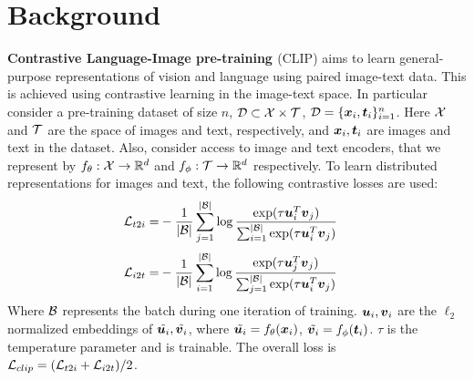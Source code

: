 \documentclass[11pt]{article}
\begin{document}
\section{Background}
\label{sec_background}
\textbf{Contrastive Language-Image pre-training \citep{radford2021learning}} (CLIP) aims to learn general-purpose representations of vision and language using paired image-text data. This is achieved using contrastive learning in the image-text space. In particular consider a pre-training dataset of size $n$, $\mathcal{D} \subset \mathcal{X} \times \mathcal{T}$, $\mathcal{D} = \{\boldsymbol{x}_i, \boldsymbol{t}_i\}_{i=1}^{n}$. Here $\mathcal{X}$ and $\mathcal{T}$ are the space of images and text, respectively, and $\boldsymbol{x}_i, \boldsymbol{t}_i$ are images and text in the dataset. Also, consider access to image and text encoders, that we represent by $f_{\theta}: \mathcal{X} \rightarrow \mathbb{R}^d$ and $f_{\phi}: \mathcal{T} \rightarrow \mathbb{R}^d$ respectively. To learn distributed representations for images and text, the following contrastive losses are used:
{
\begin{align}\label{eq:t2i_clip}
\mathcal{L}_{t2i}	= & - \frac{1}{|\mathcal{B}|} \sum_{j=1}^{|\mathcal{B}|}
\log \frac{ \exp(\tau \boldsymbol{u}_i^T \boldsymbol{v}_j )  }{\sum_{i=1}^{|\mathcal{B}|}  \exp(\tau \boldsymbol{u}_{i}^T \boldsymbol{v}_{j} )  }
\end{align}
}{
\begin{align}\label{eq:i2t_clip}
\mathcal{L}_{i2t}	= & - \frac{1}{|\mathcal{B}|} \sum_{i=1}^{|\mathcal{B}|}
\log \frac{ \exp(\tau \boldsymbol{u}_j^T \boldsymbol{v}_j )  }{\sum_{j=1}^{|\mathcal{B}|}  \exp(\tau \boldsymbol{u}_{i}^T \boldsymbol{v}_{j} )}
\end{align}
}Where $\mathcal{B}$ represents the batch during one iteration of training. $\boldsymbol{u}_i, \boldsymbol{v}_i$ are the $\ell_2$ normalized embeddings of $\Tilde{\boldsymbol{u}_i}, \Tilde{\boldsymbol{v}_i}$, where $\Tilde{\boldsymbol{u}_i} = f_\theta(\boldsymbol{x}_{i})$, $\Tilde{\boldsymbol{v}_i} = f_\phi(\boldsymbol{t}_{i})$. $\tau$ is the temperature parameter and is trainable. The overall loss is $\mathcal{L}_{clip} = (\mathcal{L}_{t2i} + \mathcal{L}_{i2t})/2$. 
\end{document}
